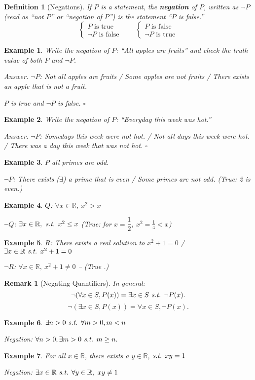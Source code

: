 \documentclass[12pt,a4paper]{article}
\newtheorem{df}{Definition}[subsection]
\newtheorem{eg}{Example}[subsection]
\newenvironment*{ans}{\par{\textit{Answer. }}}{\hfill{$\square$}\par}
\newtheorem*{rmk}{\indent Remark}
\def\R{{\mathbb{R}}}
\def\st{\emph{ s.t. }}
\begin{document}
\begin{df}[Negations]
	If $P$ is a statement, the \textbf{negation} of $P$, written as $\neg P$ (read as ``not $P$'' or ``negation of $P$'') is the statement ``$P$ is false.''	
	\[\begin{cases}P\text{ is true}\\\neg P\text{ is false}\end{cases}\qquad\begin{cases}P\text{ is false}\\\neg P\text{ is true}\end{cases}\]
\end{df}
\begin{eg}
	Write the negation of $P$: ``All apples are fruits'' and check the truth value of both $P$ and $\neg P$.
	\begin{ans}
		$\neg P$: Not all apples are fruits / Some apples are not fruits / There exists an apple that is not a fruit.
		
		$P$ is true and $\neg P$ is false. 
	\end{ans}
\end{eg}
\begin{eg}
	Write the negation of $P$: ``Everyday this week was hot.''
	\begin{ans}
		$\neg P$: Somedays this week were not hot. / Not all days this week were hot. / There was a day this week that was not hot. 
	\end{ans}
\end{eg}
\begin{eg}
	$P$ all primes are odd.
	
	$\neg P$: There exists ($\exists$) a prime that is even / Some primes are not odd. (True: 2 is even.)
\end{eg}
\begin{eg}
	$Q$: $\forall x\in\R,\ x^2>x$
	
	$\neg Q$: $\exists x\in\R,\st x^2\leq x$ (True: for $x=\dfrac{1}{2},\ x^2=\frac{1}{4}<x$)	
\end{eg}
\begin{eg}
	$R$: There exists a real solution to $x^2+1=0$ / $\exists x\in\R\st x^2+1=0$
	
	$\neg R$: $\forall x\in\R,\ x^2+1\neq0$ -- (True	.)
\end{eg}
\begin{rmk}[Negating Quantifiers]
	In general: 
	\[\neg(\forall x\in S, P(x))=\exists x\in S\st\neg P(x). \]
	\[\neg(\exists x\in S, P(x))=\forall x\in S, \neg P(x). \]	
\end{rmk}
\begin{eg}
	$\exists n>0\st\forall m>0, m<n$
	
	Negation: $\forall n>0, \exists m>0\st m\geq n.$	
\end{eg}
\begin{eg}
	For all $x\in\R$, there exists a $y\in\R$,$\st xy=1$
	
	Negation: $\exists x\in\R\st\forall y\in\R,\ xy\neq1$	
\end{eg}
\end{document}
